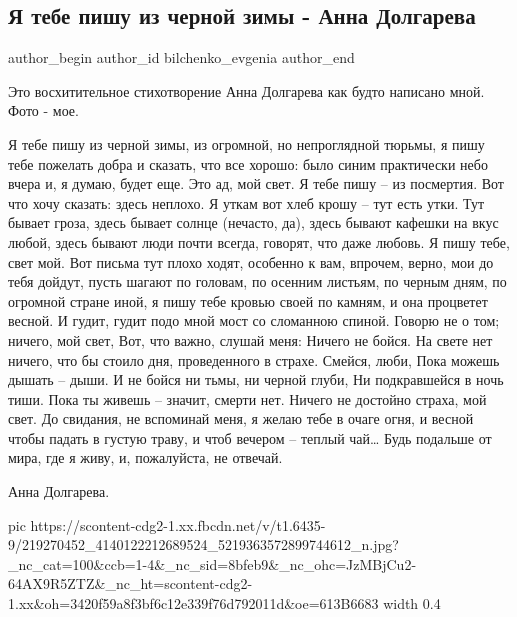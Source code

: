  
 
 
 
 
 
\subsection{Я тебе пишу из черной зимы - Анна Долгарева}
\label{sec:10_08_2021.fb.bilchenko_evgenia.1.anna_dolgareva_chernaja_zima}
 
\ifcmt
 author_begin
   author_id bilchenko_evgenia
 author_end
\fi

Это восхитительное стихотворение Анна Долгарева  как будто написано мной. Фото - мое.

\begin{multicols}{2}
\obeycr
Я тебе пишу из черной зимы, 
из огромной, но непроглядной тюрьмы, 
я пишу тебе пожелать добра 
и сказать, что все хорошо: 
было синим практически небо вчера 
и, я думаю, будет еще.
\smallskip
Это ад, мой свет. Я тебе пишу – 
из посмертия. Вот что хочу сказать: 
здесь неплохо. Я уткам вот хлеб крошу – 
тут есть утки. Тут бывает гроза, 
здесь бывает солнце (нечасто, да), 
здесь бывают кафешки на вкус любой, 
здесь бывают люди почти всегда, 
говорят, что даже любовь.
\smallskip
Я пишу тебе, свет мой. Вот письма тут 
плохо ходят, особенно к вам, 
впрочем, верно, мои до тебя дойдут, 
пусть шагают по головам, 
по осенним листьям, по черным дням, 
по огромной стране иной, 
я пишу тебе кровью своей по камням, 
и она процветет весной.
\smallskip
И гудит, гудит подо мной 
мост со сломанною спиной.
Говорю не о том; ничего, мой свет, 
Вот, что важно, слушай меня: 
Ничего не бойся. На свете нет 
ничего, что бы стоило дня, 
проведенного в страхе. 
\smallskip
Смейся, люби, 
Пока можешь дышать – дыши. 
И не бойся ни тьмы, ни черной глуби, 
Ни подкравшейся в ночь тиши.
Пока ты живешь – значит, смерти нет. 
Ничего не достойно страха, мой свет.
\smallskip
До свидания, не вспоминай меня, 
я желаю тебе в очаге огня, 
и весной чтобы падать в густую траву, 
и чтоб вечером – теплый чай… 
Будь подальше от мира, где я живу, 
и, пожалуйста, не отвечай.
\restorecr
\end{multicols}

Анна Долгарева.

\ifcmt
  pic https://scontent-cdg2-1.xx.fbcdn.net/v/t1.6435-9/219270452_4140122212689524_5219363572899744612_n.jpg?_nc_cat=100&ccb=1-4&_nc_sid=8bfeb9&_nc_ohc=JzMBjCu2-64AX9R5ZTZ&_nc_ht=scontent-cdg2-1.xx&oh=3420f59a8f3bf6c12e339f76d792011d&oe=613B6683
  width 0.4
\fi

